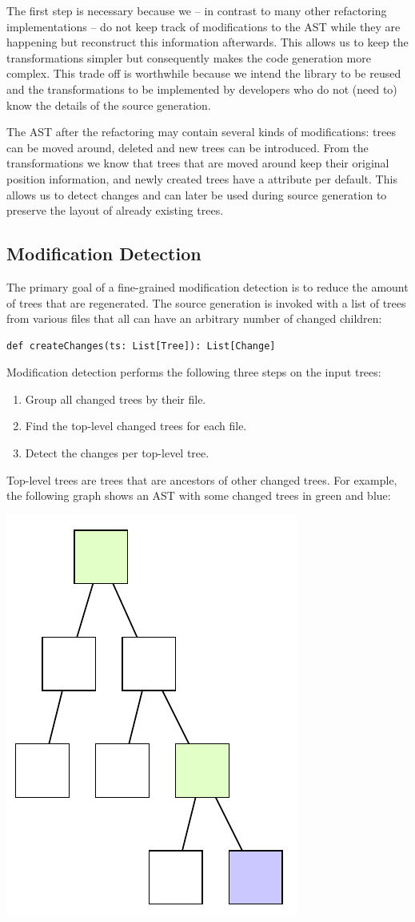 The first step is necessary because we -- in contrast to many other refactoring implementations -- do not keep track of modifications to the AST while they are happening but reconstruct this information afterwards. This allows us to keep the transformations simpler but consequently makes the code generation more complex. This trade off is worthwhile because we intend the library to be reused and the transformations to be implemented by developers who do not (need to) know the details of the source generation.

The AST after the refactoring may contain several kinds of modifications: trees can be moved around, deleted and new trees can be introduced. From the transformations we know that trees that are moved around keep their original position information, and newly created trees have a  attribute per default. This allows us to detect changes and can later be used during source generation to preserve the layout of already existing trees. 

\subsection{Modification Detection}

The primary goal of a fine-grained modification detection is to reduce the amount of trees that are regenerated. The source generation is invoked with a list of trees from various files that all can have an arbitrary number of changed children:

\begin{lstlisting}
def createChanges(ts: List[Tree]): List[Change]
\end{lstlisting}

Modification detection performs the following three steps on the input trees:

\begin{enumerate}
 \item Group all changed trees by their file.
 \item Find the top-level changed trees for each file.
 \item Detect the changes per top-level tree.
\end{enumerate}

Top-level trees are trees that are ancestors of other changed trees. For example, the following graph shows an AST with some changed trees in green and blue:

\begin{center}
\includegraphics[width=0.2\linewidth]{ast_with_changes.pdf}
\end{center}

